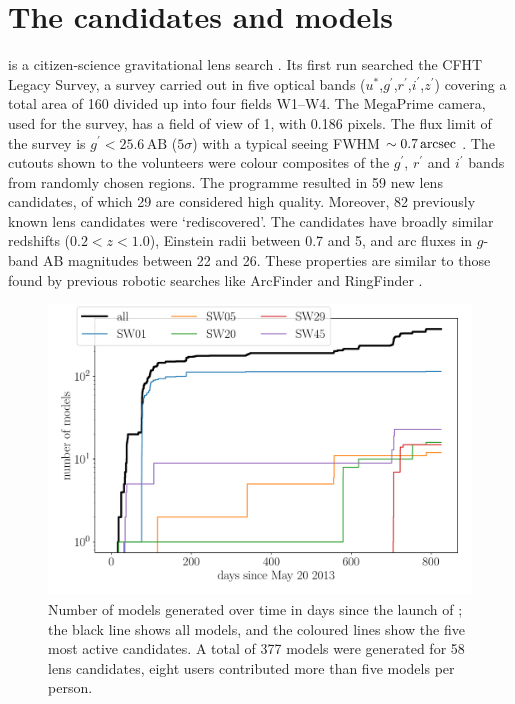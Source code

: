 \section{The candidates and models}
\label{sec:candidates_models}

\SW is a citizen-science gravitational lens search
\citep{2016MNRAS.455.1171M}.  Its first run searched the CFHT Legacy
Survey, a survey carried out in five optical bands
($u^*$,$g^\prime$,$r^\prime$,$i^\prime$,$z^\prime$) covering a total
area of \SI{160}{\sqdeg} divided up into four fields W1--W4.  The
MegaPrime camera, used for the survey, has a field of view of
\SI{1}{\sqdeg}, with \SI{0.186}{\arcsec} pixels. The flux limit of the
survey is $g^\prime<25.6\,\text{AB}$ ($5 \sigma$) with a typical seeing
FWHM $\sim \SI{0.7}{\ensuremath{\text{arcsec}}}$ \citep{2013MNRAS.433.2545E}. The cutouts
shown to the volunteers were colour composites of the $g^\prime$,
$r^\prime$ and $i^\prime$ bands from randomly chosen regions.
The programme resulted in 59 new lens candidates, of which 29 are
considered high quality.
Moreover, 82 previously known lens candidates were `rediscovered'.
The candidates have broadly similar redshifts ($0.2<z<1.0$), Einstein
radii between 0.7 and \SI{5}{\arcsec}, and arc fluxes in $g$-band AB
magnitudes between 22 and 26. These properties are
similar to those found by previous robotic searches like ArcFinder and
RingFinder \citep{2016MNRAS.455.1191M}.


\begin{figure}
  \includegraphics[width=\linewidth]{img/timelapse3}
  \caption{ Number of models generated over time in days since the
    launch of \SpL; the black line shows all models, and the coloured
    lines show the five most active candidates. A total of 377 models
    were generated for 58 lens candidates, eight users contributed
    more than five models per person. }
  \label{fig:time}
\end{figure}


